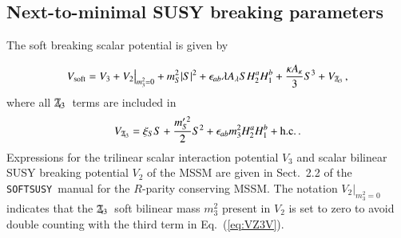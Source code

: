 \documentclass[final,3p,times,pdflatex]{elsarticle}
\def\SOFTSUSY{{\tt SOFTSUSY}}
\newcommand{\be}{\begin{equation}}
\newcommand{\ee}{\end{equation}}
\newcommand{\ba}{\begin{eqnarray}}
\newcommand{\ea}{\end{eqnarray}}
\newcommand{\Zv}{\,\mathbf{\backslash}\mkern-11.0mu{\mathbb{Z}}_{3}} %
\begin{document}
\subsection{Next-to-minimal SUSY breaking parameters \label{sec:susybreak}}
The soft breaking scalar potential is given by

\be 
V_{\textrm{soft}} = V_3 + V_2\big|^{}_{m_3^2=0} + m_S^2|S|^2 
+ \epsilon_{ab} \lambda A_\lambda S H^a_2 H^b_1 
+ \frac{\kappa A_\kappa}{3} S^3 + V_{\Zv} \,,
\ee 
%
where all $\Zv$~terms are included in
\be 
V_{\Zv} =  \xi_S S + \frac{m_S^{\prime \, 2}}{2} S^2
  + \epsilon_{ab} m_3^2 H_2^a H_1^b + \textrm{h.c.} \,.
\label{eq:VZ3V}
\ee
% 
Expressions for the trilinear scalar interaction potential $V_3$ and scalar 
bilinear SUSY breaking potential $V_2$  of the MSSM are given in Sect.\ 2.2 of 
the \SOFTSUSY~manual \cite{Allanach:2001kg} for the $R$-parity conserving MSSM.
 The notation $V_2\big|_{m_3^2=0}$ indicates that the $\Zv$~soft bilinear mass 
$m_3^2$ present in $V_2$ is set to zero to avoid double counting with the third term in Eq.~(\ref{eq:VZ3V}).

\end{document}
